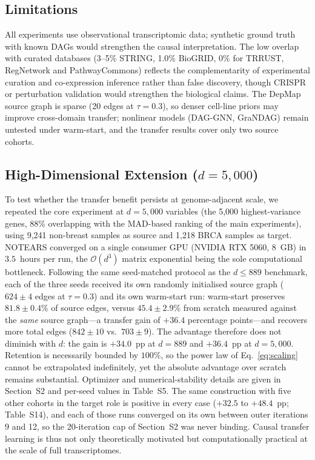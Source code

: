 \documentclass{ws-jbcb}
\begin{document}
\subsection{Limitations}

All experiments use observational transcriptomic data; synthetic ground truth with known DAGs would strengthen the causal interpretation. The low overlap with curated databases (3--5\% STRING, 1.0\% BioGRID, 0\% for TRRUST, RegNetwork and PathwayCommons) reflects the complementarity of experimental curation and co-expression inference rather than false discovery, though CRISPR or perturbation validation would strengthen the biological claims. The DepMap source graph is sparse (20 edges at $\tau=0.3$), so denser cell-line priors may improve cross-domain transfer; nonlinear models (DAG-GNN, GraNDAG) remain untested under warm-start, and the transfer results cover only two source cohorts.

\subsection{High-Dimensional Extension ($d = 5{,}000$)}
\label{sec:d5000}

To test whether the transfer benefit persists at genome-adjacent scale, we repeated the core experiment at $d = 5{,}000$ variables (the 5,000 highest-variance genes, 88\% overlapping with the MAD-based ranking of the main experiments), using 9,241 non-breast samples as source and 1,218 BRCA samples as target. NOTEARS converged on a single consumer GPU (NVIDIA RTX 5060, 8~GB) in $3.5$~hours per run, the $\mathcal{O}(d^3)$ matrix exponential being the sole computational bottleneck. Following the same seed-matched protocol as the $d \le 889$ benchmark, each of the three seeds received its own randomly initialised source graph ($624 \pm 4$ edges at $\tau=0.3$) and its own warm-start run: warm-start preserves $81.8 \pm 0.4\%$ of source edges, versus $45.4 \pm 2.9\%$ from scratch measured against the \emph{same} source graph---a transfer gain of $+36.4$ percentage points---and recovers more total edges ($842 \pm 10$ vs.\ $703 \pm 9$). The advantage therefore does not diminish with $d$: the gain is $+34.0$~pp at $d=889$ and $+36.4$~pp at $d=5{,}000$. Retention is necessarily bounded by $100\%$, so the power law of Eq.~\eqref{eq:scaling} cannot be extrapolated indefinitely, yet the absolute advantage over scratch remains substantial. Optimizer and numerical-stability details are given in Section~S2 and per-seed values in Table~S5. The same construction with five other cohorts in the target role is positive in every case ($+32.5$ to $+48.4$~pp; Table~S14), and each of those runs converged on its own between outer iterations 9 and 12, so the 20-iteration cap of Section~S2 was never binding. Causal transfer learning is thus not only theoretically motivated but computationally practical at the scale of full transcriptomes.
\end{document}
